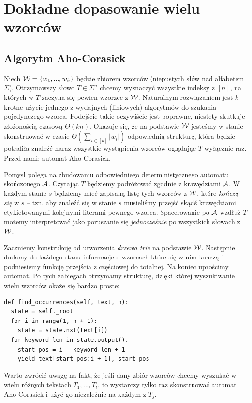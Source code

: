 \section{Dokładne dopasowanie 
wielu wzorców}

\subsection{Algorytm Aho-Corasick}

Niech $\operatorname{\mathcal{W}}=\{w_1,...,w_k\}$ będzie zbiorem wzorców (niepustych słów nad alfabetem $\Sigma$). Otrzymawszy słowo $T\in\Sigma^n$ chcemy wyznaczyć wszystkie indeksy z $[n]$, na których w $T$ zaczyna się pewien wzorzec z $\operatorname{\mathcal{W}}$. Naturalnym rozwiązaniem jest $k$-krotne użycie jednego z wydajnych (liniowych) algorytmów do szukania pojedynczego wzorca. Podejście takie oczywiście jest poprawne, niestety skutkuje złożonością czasową $\Theta(kn)$. Okazuje się, że na podstawie $\operatorname{\mathcal{W}}$ jesteśmy w stanie skonstruować w czasie $\Theta(\sum_{i\in[k]}|w_i|)$ odpowiednią strukturę, która będzie potrafiła znaleźć naraz wszystkie wystąpienia wzorców oglądając $T$ wyłącznie raz. Przed nami: automat Aho-Corasick.

Pomysł polega na zbudowaniu odpowiedniego deterministycznego automatu skończonego $\operatorname{\mathcal{A}}$. Czytając $T$ będziemy podróżować zgodnie z krawędziami $\operatorname{\mathcal{A}}$. W każdym stanie $s$ będziemy mieć zapisaną listę tych wzorców z $\operatorname{\mathcal{W}}$, które \textit{kończą się} w $s$ -- tzn. aby znaleźć się w stanie $s$ musieliśmy przejść skądś krawędziami etykietowanymi kolejnymi literami pewnego wzorca. Spacerowanie po $\operatorname{\mathcal{A}}$ wzdłuż $T$ możemy interpretować jako poruszanie się \textit{jednocześnie} po wszystkich słowach z $\operatorname{\mathcal{W}}$.

Zaczniemy konstrukcję od utworzenia \textit{drzewa trie} na podstawie $\operatorname{\mathcal{W}}$. Następnie dodamy do każdego stanu informacje o wzorcach które się w nim kończą i podniesiemy funkcję przejścia z częściowej do totalnej. Na koniec uprościmy automat. Po tych zabiegach otrzymamy strukturę, dzięki której wyszukiwanie wielu wzorców okaże się bardzo proste:

\begin{verbatim}
def find_occurrences(self, text, n):
  state = self._root
  for i in range(1, n + 1):
    state = state.nxt(text[i])
  for keyword_len in state.output():
    start_pos = i - keyword_len + 1
    yield text[start_pos:i + 1], start_pos
\end{verbatim}

Warto zwrócić uwagę na fakt, że jeśli dany zbiór wzorców chcemy wyszukać w wielu różnych tekstach $T_1,...,T_t$, to wystarczy tylko raz skonstruować automat Aho-Corasick i użyć go niezależnie na każdym z $T_j$.

